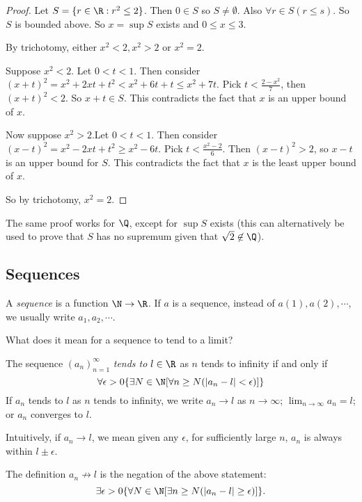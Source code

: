 \documentclass[a4paper]{article}
\begin{document}
  \begin{proof}
    Let $S = \{r\in \R: r^2 \leq 2\}$. Then $0\in S$ so $S\not= \emptyset$. Also $\forall r\in S(r \leq s)$. So $S$ is bounded above. So $x = \sup S$ exists and $0\leq x \leq 3$.

    By trichotomy, either $x^2 < 2, x^2 > 2$ or $x^2 = 2$.

    Suppose $x^2 < 2$. Let $0 < t < 1$. Then consider $(x + t)^2 = x^2 + 2xt + t^2 < x^2 + 6t + t \leq x^2 + 7t$. Pick $t < \frac{2 - x^2}{7}$, then $(x + t)^2 < 2$. So $x + t \in S$. This contradicts the fact that $x$ is an upper bound of $x$.

    Now suppose $x^2 > 2$.Let $0 < t < 1$. Then consider $(x - t)^2 = x^2 - 2xt + t^2 \geq x^2 - 6t$. Pick $t < \frac{x^2 - 2}{6}$. Then $(x - t)^2 > 2$, so $x - t$ is an upper bound for $S$. This contradicts the fact that $x$ is the least upper bound of $x$.

    So by trichotomy, $x^2 = 2$.
  \end{proof}
  \note The same proof works for $\Q$, except for $\sup S$ exists (this can alternatively be used to prove that $S$ has no supremum given that $\sqrt{2}\not\in \Q$).
  \subsection{Sequences}
  \begin{defi}[Sequence]
    A \emph{sequence} is a function $\N\to \R$. If $a$ is a sequence, instead of $a(1), a(2), \cdots$, we usually write $a_1, a_2, \cdots$.
  \end{defi}

  What does it mean for a sequence to tend to a limit?
  \begin{defi}
    The sequence $(a_n)_{n = 1}^{\infty}$ \emph{tends to} $l\in \R$ as $n$ tends to infinity if and only if
    \[
      \forall \epsilon > 0 \{\exists N \in \N[\forall n \geq N(|a_n - l| < \epsilon)]\}
    \]
    If $a_n$ tends to $l$ as $n$ tends to infinity, we write $a_n \to l$ as $n\to \infty$; $\displaystyle \lim_{n \to \infty} a_n = l$; or $a_n$ converges to $l$.
  \end{defi}
  Intuitively, if $a_n \to l$, we mean given any $\epsilon$, for sufficiently large $n$, $a_n$ is always within $l\pm \epsilon$.

  \note The definition $a_n\not\to l$ is the negation of the above statement:
  \[
    \exists \epsilon > 0\{\forall N\in \N[\exists n\geq N(|a_n - l| \geq \epsilon)]\}.
  \]
\end{document}
